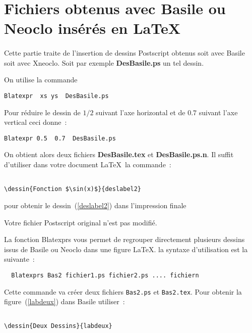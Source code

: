 

\section{Fichiers obtenus avec Basile ou Neoclo  ins\'er\'es en \LaTeX} 

\paragraph{}Cette partie traite de l'insertion de dessins Postscript 
 obtenus soit avec Basile soit avec Xneoclo. Soit par exemple {\bf DesBasile.ps} 
 un tel dessin. 

On utilise la commande 
\begin{verbatim}
Blatexpr  xs ys  DesBasile.ps
\end{verbatim}
Pour r\'eduire le dessin de $1/2$ suivant l'axe horizontal et de $0.7$ suivant l'axe vertical ceci donne~:
\begin{verbatim}
Blatexpr 0.5  0.7  DesBasile.ps
\end{verbatim}
On obtient alors deux  fichiers {\bf DesBasile.tex} 
 et {\bf DesBasile.ps.n}. Il suffit d'utiliser dans votre document 
 \LaTeX\, la commande~:
\begin{verbatim}
 
\dessin{Fonction $\sin(x)$}{deslabel2}
\end{verbatim}
pour obtenir le dessin~(\ref{deslabel2}) dans l'impression finale

 

Votre fichier Postscript original n'est pas modifi\'e.

La fonction Blatexprs vous permet de regrouper directement plusieurs 
dessins issus de Basile ou Neoclo dans une figure \LaTeX. la syntaxe d'utilisation est la suivante~:
\begin{verbatim}
  Blatexprs Bas2 fichier1.ps fichier2.ps .... fichiern
\end{verbatim}
Cette commande va cr\'eer deux fichiers \verb+Bas2.ps+ et \verb+Bas2.tex+. Pour 
obtenir la figure~(\ref{labdeux}) dans Basile utiliser~:
\begin{verbatim}
 
\dessin{Deux Dessins}{labdeux}
\end{verbatim}
 



